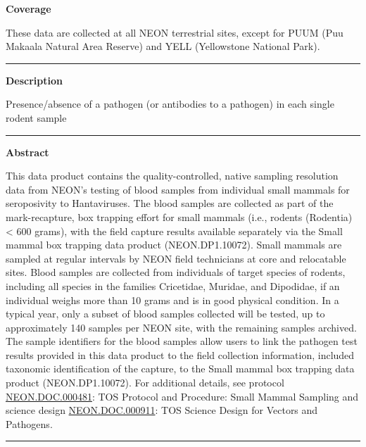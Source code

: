 \documentclass[]{article}
\begin{document}
\textbf{Coverage}

These data are collected at all NEON terrestrial sites, except for PUUM
(Puu Makaala Natural Area Reserve) and YELL (Yellowstone National Park).

\begin{center}\rule{0.5\linewidth}{\linethickness}\end{center}

\textbf{Description}

Presence/absence of a pathogen (or antibodies to a pathogen) in each
single rodent sample

\begin{center}\rule{0.5\linewidth}{\linethickness}\end{center}

\textbf{Abstract}

This data product contains the quality-controlled, native sampling
resolution data from NEON's testing of blood samples from individual
small mammals for seroposivity to Hantaviruses. The blood samples are
collected as part of the mark-recapture, box trapping effort for small
mammals (i.e., rodents (Rodentia) \textless{} 600 grams), with the field
capture results available separately via the Small mammal box trapping
data product (NEON.DP1.10072). Small mammals are sampled at regular
intervals by NEON field technicians at core and relocatable sites. Blood
samples are collected from individuals of target species of rodents,
including all species in the families Cricetidae, Muridae, and
Dipodidae, if an individual weighs more than 10 grams and is in good
physical condition. In a typical year, only a subset of blood samples
collected will be tested, up to approximately 140 samples per NEON site,
with the remaining samples archived. The sample identifiers for the
blood samples allow users to link the pathogen test results provided in
this data product to the field collection information, included
taxonomic identification of the capture, to the Small mammal box
trapping data product (NEON.DP1.10072). For additional details, see
protocol
\href{http://data.neonscience.org/api/v0/documents/NEON.DOC.000481vJ}{NEON.DOC.000481}:
TOS Protocol and Procedure: Small Mammal Sampling and science design
\href{http://data.neonscience.org/api/v0/documents/NEON.DOC.000911vA}{NEON.DOC.000911}:
TOS Science Design for Vectors and Pathogens.

\begin{center}\rule{0.5\linewidth}{\linethickness}\end{center}
\end{document}
